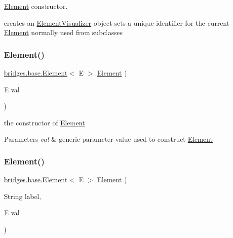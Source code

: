 \mbox{\hyperlink{classbridges_1_1base_1_1_element}{Element}} constructor. 

creates an \mbox{\hyperlink{classbridges_1_1base_1_1_element_visualizer}{Element\+Visualizer}} object sets a unique identifier for the current \mbox{\hyperlink{classbridges_1_1base_1_1_element}{Element}} normally used from subclasses \mbox{\label{classbridges_1_1base_1_1_element_a6cb9b3b85b923602aad5c1be6696d825}} 
\subsubsection{\texorpdfstring{Element()}{Element()}\hspace{0.1cm}{\footnotesize\ttfamily [2/4]}}
{\footnotesize\ttfamily \mbox{\hyperlink{classbridges_1_1base_1_1_element}{bridges.\+base.\+Element}}$<$ E $>$.\mbox{\hyperlink{classbridges_1_1base_1_1_element}{Element}} (\begin{DoxyParamCaption}\item[{E}]{val }\end{DoxyParamCaption})}



the constructor of \mbox{\hyperlink{classbridges_1_1base_1_1_element}{Element}} 


\begin{DoxyParams}{Parameters}
{\em val} & generic parameter value used to construct \mbox{\hyperlink{classbridges_1_1base_1_1_element}{Element}} \\
\hline
\end{DoxyParams}
\mbox{\label{classbridges_1_1base_1_1_element_a14e857e8050eac518900a458f0364d8e}} 
\subsubsection{\texorpdfstring{Element()}{Element()}\hspace{0.1cm}{\footnotesize\ttfamily [3/4]}}
{\footnotesize\ttfamily \mbox{\hyperlink{classbridges_1_1base_1_1_element}{bridges.\+base.\+Element}}$<$ E $>$.\mbox{\hyperlink{classbridges_1_1base_1_1_element}{Element}} (\begin{DoxyParamCaption}\item[{String}]{label,  }\item[{E}]{val }\end{DoxyParamCaption})}



